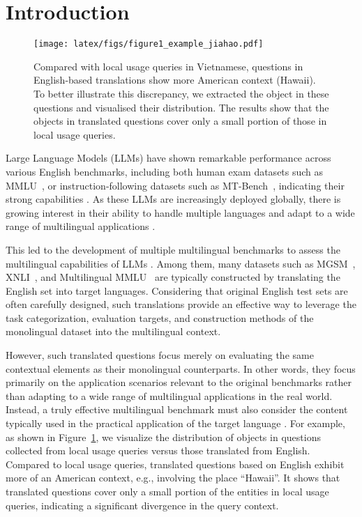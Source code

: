 \section{Introduction}

\begin{figure}[t]
\centering
\texttt{[image: latex/figs/figure1\_example\_jiahao.pdf]}
    \caption{ 
    Compared with local usage queries in Vietnamese, questions in English-based translations show more American context (Hawaii). To better illustrate this discrepancy, we extracted the object in these questions and visualised their distribution. The results show that the objects in translated questions cover only a small portion of those in local usage queries.
    }
    \label{fig: intro}  
\end{figure}


Large Language Models (LLMs) have shown remarkable performance across various English benchmarks, including both human exam datasets such as MMLU~\cite{hendrycks_measuring_2021}, or instruction-following datasets such as MT-Bench~\cite{zheng_judging_2023}, indicating their strong capabilities \cite{openai_gpt-4_2023,dubey_llama_2024,gemma_team_gemma_2024}. 
As these LLMs are increasingly deployed globally, there is growing interest in their ability to handle multiple languages and adapt to a wide range of multilingual applications \cite{huang_not_2023,qin_multilingual_2024,huang_survey_2024,dou_sailor_2024,nguyen_seallms_2023,zhang_seallms_2024}. 

This led to the development of multiple multilingual benchmarks to assess the multilingual capabilities of LLMs \cite{lai_chatgpt_2023,ahuja_mega_2023,zhang_m3exam_2023}. 
Among them, many datasets such as MGSM~\cite{shi_language_2022}, XNLI~\cite{conneau_xnli_2018}, and Multilingual MMLU~\cite{hendrycks_measuring_2021,openai_gpt-4_2023} are typically constructed by translating the English set into target languages.
Considering that original English test sets are often carefully designed, such translations provide an effective way to leverage the task categorization, evaluation targets, and construction methods of the monolingual dataset into the multilingual context.


However, such translated questions focus merely on evaluating the same contextual elements as their monolingual counterparts.
In other words, they focus primarily on the application scenarios relevant to the original benchmarks rather than adapting to a wide range of multilingual applications in the real world.
Instead, a truly effective multilingual benchmark must also consider the content typically used in the practical application of the target language \cite{liu_is_2024}.
For example, as shown in Figure~\ref{fig: intro}, we visualize the distribution of objects in questions collected from local usage queries versus those translated from English.
Compared to local usage queries, translated questions based on English exhibit more of an American context, e.g., involving the place ``Hawaii''.  It shows that translated questions cover only a small portion of the entities in local usage queries, indicating a significant divergence in the query context.


